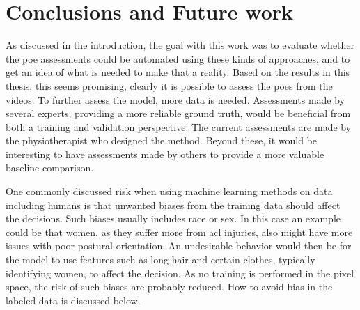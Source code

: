 \chapter{Conclusions and Future work} \label{ch:conclusions}
As discussed in the introduction, the goal with this work was to evaluate whether the \gls{poe} assessments could be automated using these kinds of approaches, and to get an idea of what is needed to make that a reality. Based on the results in this thesis, this seems promising, clearly it is possible to assess the \glspl{poe} from the videos. To further assess the model, more data is needed. Assessments made by several experts, providing a more reliable ground truth, would be beneficial from both a training and validation perspective. The current assessments are made by the physiotherapist who designed the method. Beyond these, it would be interesting to have assessments made by others to provide a more valuable baseline comparison.



One commonly discussed risk when using machine learning methods on data including humans is that unwanted biases from the training data should affect the decisions. Such biases usually includes race or sex. In this case an example could be that women, as they suffer more from \gls{acl} injuries, also  might have more issues with poor postural orientation. An undesirable behavior would then be for the model to use features such as long hair and certain clothes, typically identifying women, to affect the decision. As no training is performed in the pixel space, the risk of such biases are probably reduced. How to avoid bias in the labeled data is discussed below.


